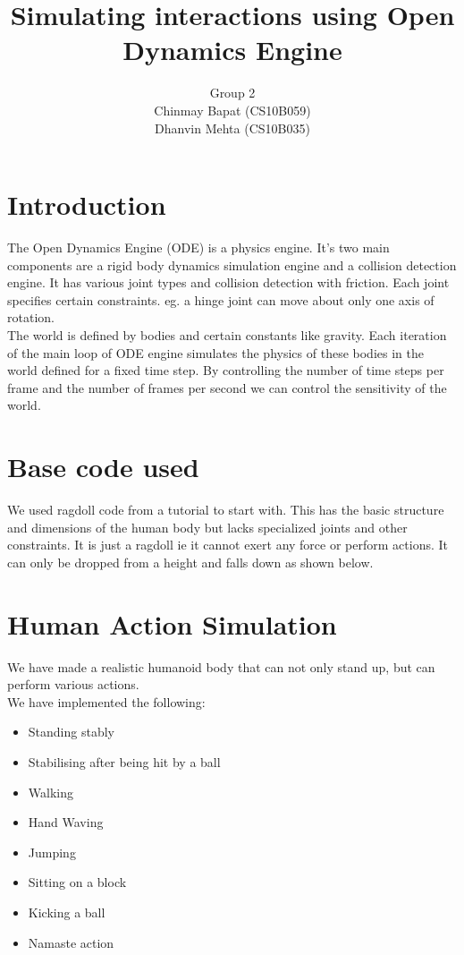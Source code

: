 \documentclass[11pt]{article}
\author{Group 2 \\Chinmay Bapat (CS10B059)\\ Dhanvin Mehta (CS10B035)}
\title{Simulating interactions using Open Dynamics Engine}
\begin{document}
\maketitle
\section{Introduction}
The Open Dynamics Engine (ODE) is a physics engine. It's two main components
are a rigid body dynamics simulation engine and a collision detection engine.
It has various joint types and collision detection with friction. Each joint
specifies certain constraints. eg. a hinge joint can move about only one
axis of rotation.\\
The world is defined by bodies and certain constants like gravity.
Each iteration of the main loop of ODE engine simulates the physics of these
bodies in the world defined for a fixed time step. By controlling the number
of time steps per frame and the number of frames per second we can control
the sensitivity of the world.

\section{Base code used}
We used ragdoll code from a tutorial to start with. This has the basic
structure and dimensions of the human body but lacks specialized joints and
other constraints. It is just a ragdoll ie it cannot exert any force or 
perform actions. It can only be dropped from a height and falls down as shown
below.


\section{Human Action Simulation}
We have made a realistic humanoid body that can not only stand up,
but can perform various actions. \\
We have implemented the following:\\
\begin{itemize}
    \item Standing stably
    \item Stabilising after being hit by a ball
    \item Walking
    \item Hand Waving
    \item Jumping
    \item Sitting on a block
    \item Kicking a ball
    \item Namaste action
\end{itemize}
\end{document}
